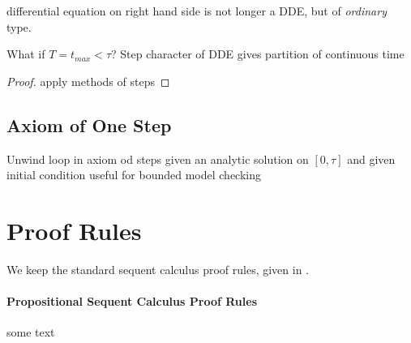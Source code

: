 \documentclass[10pt]{report}
\begin{document}
        differential equation on right hand side is not longer a DDE, but of \emph{ordinary} type. 

        What if $T=t_{max} < \tau$?
        Step character of DDE gives partition of continuous time

        \begin{proof}
            apply methods of steps
        \end{proof}

    \subsection{Axiom of One Step}
        \label{sex:axiom-of-one-step}

        Unwind loop in axiom od steps
        given an analytic solution on $[0,\tau]$ and given initial condition
        useful for bounded model checking

\section{Proof Rules}
    \label{sec:proof-rules}

    We keep the standard sequent calculus proof rules, given in \dL.

    \paragraph{Propositional Sequent Calculus Proof Rules}
        \label{sec:propositional-rules}

        some text

        \begin{calculus}

        \end{calculus}
\end{document}
